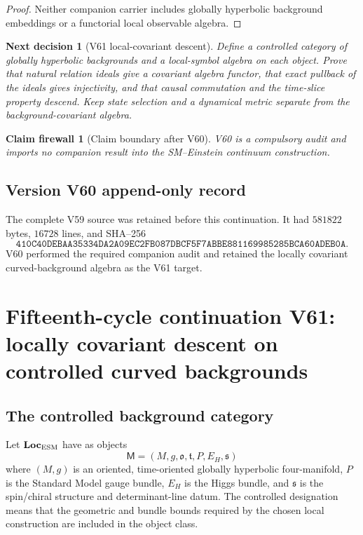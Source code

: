 \documentclass[11pt]{article}
\newtheorem{firewall}[theorem]{Claim firewall}
\newtheorem{decision}[theorem]{Next decision}
\theoremstyle{remark}
\begin{document}
\begin{proof}
Neither companion carrier includes globally hyperbolic background
embeddings or a functorial local observable algebra.
\end{proof}

\begin{decision}[V61 local-covariant descent]
\label{dec:v15v60-next}
Define a controlled category of globally hyperbolic backgrounds and
a local-symbol algebra on each object.  Prove that natural relation
ideals give a covariant algebra functor, that exact pullback of the
ideals gives injectivity, and that causal commutation and the
time-slice property descend.  Keep state selection and a dynamical
metric separate from the background-covariant algebra.
\end{decision}

\begin{firewall}[Claim boundary after V60]
\label{fire:v15v60}
V60 is a compulsory audit and imports no companion result into the
SM--Einstein continuum construction.
\end{firewall}

\section*{Version V60 append-only record}
The complete V59 source was retained before this continuation.  It
had \(581822\) bytes, \(16728\) lines, and SHA--256
\[
 \texttt{410C40DEBAA35334DA2A09EC2FB087DBCF5F7ABBE881169985285BCA60ADEB0A}.
\]
V60 performed the required companion audit and retained the
locally covariant curved-background algebra as the V61 target.

\chapter{Fifteenth-cycle continuation V61: locally covariant descent on controlled curved backgrounds}
\label{sec:v15v61}

\section{The controlled background category}

Let \({\bf Loc}_{\rm ESM}\) have as objects
\[
 {\mathsf M}=(M,g,\mathfrak o,\mathfrak t,P,E_H,\mathfrak s)   \tag{61.1}
\]
where \((M,g)\) is an oriented, time-oriented globally hyperbolic
four-manifold, \(P\) is the Standard Model gauge bundle, \(E_H\)
is the Higgs bundle, and \(\mathfrak s\) is the spin/chiral
structure and determinant-line datum.  The controlled designation
means that the geometric and bundle bounds required by the chosen
local construction are included in the object class.
\end{document}
